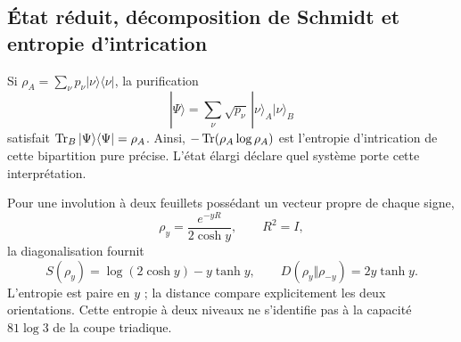 

\subsection{État réduit, décomposition de Schmidt et entropie d'intrication}
Si $\rho_A=\sum_\nu p_\nu|\nu\rangle\langle\nu|$,
la purification
\[
|\Psi\rangle=\sum_\nu\sqrt{p_\nu}\,
|\nu\rangle_A|\nu\rangle_B
\]
satisfait $\operatorname{Tr}_B|\Psi\rangle\langle\Psi|=\rho_A$.
Ainsi, $-\operatorname{Tr}(\rho_A\log\rho_A)$ est l'entropie d'intrication
de cette bipartition pure précise. L'état élargi déclare
quel système porte cette interprétation.

Pour une involution à deux feuillets possédant un vecteur propre de chaque signe,
\[
\rho_y=\frac{e^{-yR}}{2\cosh y},\qquad R^2=I,
\]
la diagonalisation fournit
\[
S(\rho_y)=\log(2\cosh y)-y\tanh y,\qquad
D(\rho_y\Vert\rho_{-y})=2y\tanh y.
\]
L'entropie est paire en $y$ ; la distance compare explicitement
les deux orientations. Cette entropie à deux niveaux ne s'identifie pas
à la capacité $81\log3$ de la coupe triadique.
